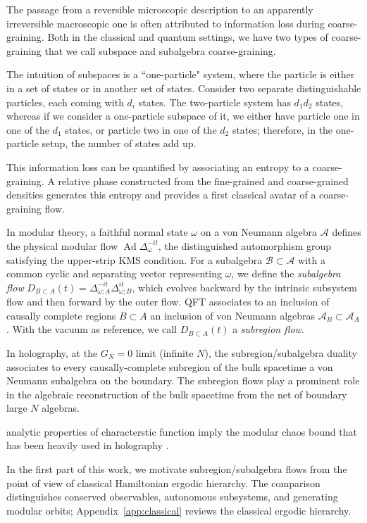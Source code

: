 \documentclass[a4paper,11pt]{article}
\theoremstyle{definition}
\newcommand{\mA}{\mathcal{A}}
\begin{document}
The passage from a reversible microscopic description to an apparently irreversible macroscopic one is often attributed to information loss during coarse-graining. Both in the classical and quantum settings, we have two types of coarse-graining that we call subspace and subalgebra coarse-graining.


The intuition of subspaces is a ``one-particle" system, where the particle is either in a set of states or in another set of states. Consider two separate distinguishable particles, each coming with $d_i$ states. The two-particle system has $d_1d_2$ states, whereas if we consider a one-particle subspace of it, we either have particle one in one of the $d_1$ states, or particle two in one of the $d_2$ states; therefore, in the one-particle setup, the number of states add up.

This information loss can be quantified by associating an entropy to a coarse-graining. A relative phase constructed from the fine-grained and coarse-grained densities generates this entropy and provides a first classical avatar of a coarse-graining flow. 


In modular theory, a faithful normal state $\omega$ on a von Neumann algebra $\mA$ defines the physical modular flow $\operatorname{Ad}\Delta_\omega^{-it}$, the distinguished automorphism group satisfying the upper-strip KMS condition. For a subalgebra $\mathcal B\subset\mA$ with a common cyclic and separating vector representing $\omega$, we define the {\it subalgebra flow} $D_{B\subset A}(t)=\Delta_{\omega;A}^{-it}\Delta_{\omega;B}^{it}$, which evolves backward by the intrinsic subsystem flow and then forward by the outer flow. QFT associates to an inclusion of causally complete regions $B\subset A$ an inclusion of von Neumann algebras $\mA_B\subset\mA_A$. With the vacuum as reference, we call $D_{B\subset A}(t)$ a {\it subregion flow}.

In holography, at the $G_N=0$ limit (infinite $N$), the subregion/subalgebra duality associates to every causally-complete subregion of the bulk spacetime a von Neumann subalgebra on the boundary. The subregion flows play a prominent role in the algebraic reconstruction of the bulk spacetime from the net of boundary large $N$ algebras. 

analytic properties of characterstic function imply the modular chaos bound that has been heavily used in holography \cite{}.

In the first part of this work, we motivate subregion/subalgebra flows from the point of view of classical Hamiltonian ergodic hierarchy. The comparison distinguishes conserved observables, autonomous subsystems, and generating modular orbits; Appendix~\ref{app:classical} reviews the classical ergodic hierarchy.
\end{document}
